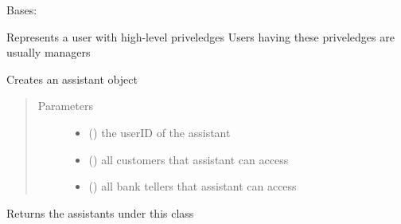 \documentclass[letterpaper,10pt,english]{sphinxmanual}
\begin{document}
\begin{fulllineitems}
\label{\detokenize{sample:sample.manager.Manager}}
Bases: 

Represents a user with high-level priveledges
Users having these priveledges are usually managers

\begin{fulllineitems}
\label{\detokenize{sample:sample.manager.Manager.createAssistant}}
Creates an assistant object
\begin{quote}\begin{description}
\item[{Parameters}] \leavevmode\begin{itemize}
\item {} 
 () \textendash{} the userID of the assistant

\item {} 
 () \textendash{} all customers that assistant can access

\item {} 
 () \textendash{} all bank tellers that assistant can access

\end{itemize}

\end{description}\end{quote}

\end{fulllineitems}


\begin{fulllineitems}
\label{\detokenize{sample:sample.manager.Manager.viewAssistants}}
Returns the assistants under this class

\end{fulllineitems}


\end{fulllineitems}
\end{document}
